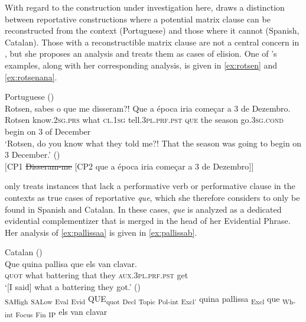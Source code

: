 With regard to the construction under investigation here, \citet{Corr2016} draws a distinction  between  reportative constructions  where a potential matrix clause  can be reconstructed from the context (Portuguese) and those where it cannot (Spanish, Catalan). Those with a reconstructible matrix clause are not a central concern in \citet{Corr2016}, but she proposes an analysis and treats them as cases of elision. One of  \citeauthor{Corr2016}'s examples, along with her corresponding analysis, is given in  \eqref{ex:rotsen} and \eqref{ex:rotsenana}.
 
\ea Portuguese 
\ea\label{ex:rotsen} (\citealt[149: ex 6]{Corr2016})\\
\gll Rotsen, sabes {o que} me disseram?! Que a época iria começar a 3 de Dezembro. \\
		Rotsen know.\textsc{2sg.prs} what \textsc{cl.1sg} tell.\textsc{3pl.prf.pst} \textsc{que} the season go.\textsc{3sg.cond} begin on 3 of December\\
	\glt 	`Rotsen, do you know what they told me?! That the season was going to begin on 3
		December.' 
\ex\label{ex:rotsenana}(\citealt[149: ex 7]{Corr2016}) \\ $[$CP1 \sout{Disseram-me} $[$CP2 que a época iria começar a 3 de Dezembro$]]$ 
  \z
\z

 \citet{Corr2016} only treats instances that lack a  performative verb or performative  clause in the contexts as true cases of reportative \emph{que}, which she therefore considers  to only be found in Spanish and Catalan. In these cases, \emph{que} is analyzed  as a dedicated evidential complementizer that is merged in the head of her Evidential Phrase. Her analysis of \eqref{ex:pallissaa} is given in \eqref{ex:pallissab}.

\ea Catalan
\ea\label{ex:pallissaa}
  (\citealt[161: ex 26]{Corr2016})\\
\gll Que quina pallisa que els van clavar.  \\
		\textsc{quot} what battering that they \textsc{aux.3pl.prf.pst} get\\
	\glt	`[I said] what a battering they got.' 
		\ex\label{ex:pallissab} (\citealt[188: ex 82]{Corr2016})\\ {\ob}\textsubscript{SAHigh} {\ob}\textsubscript{SALow} {\ob}\textsubscript{Eval} {\ob}\textsubscript{Evid} QUE\textsubscript{quot} {\ob}\textsubscript{Decl} {\ob}\textsubscript{Topic} {\ob}\textsubscript{Pol-int} {\ob}\textsubscript{Excl’} quina pallissa {\ob}\textsubscript{Excl} que {\ob}\textsubscript{Wh-int} {\ob}\textsubscript{Focus} {\ob}\textsubscript{Fin} {\ob}\textsubscript{IP} els van clavar {\cb}{\cb}{\cb}{\cb}{\cb}{\cb}{\cb}{\cb}{\cb}{\cb} 
	\z
\z

